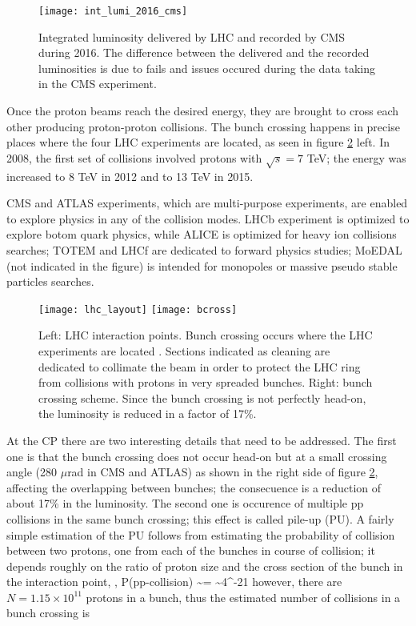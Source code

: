 \begin{figure}[!h]
\centering
\texttt{[image: int\_lumi\_2016\_cms]}
\caption [2016 CMS Integrated luminosity]{Integrated luminosity delivered by LHC and recorded by CMS during 2016. The difference between the delivered and the recorded luminosities is due to fails and issues occured during the data taking in the CMS experiment\cite{lumi}.}\label{fig:lumi}
\end{figure}

\noindent Once the proton beams reach the desired energy, they are brought to cross each other producing proton-proton collisions. The bunch crossing happens in precise places where the four LHC experiments are located, as seen in figure \ref{fig:lhc_layout} left. In 2008, the first set of collisions involved protons with $\sqrt{s}=7$ TeV; the energy was increased to 8 TeV in 2012 and to 13 TeV in 2015.

\noindent CMS and ATLAS experiments, which are multi-purpose experiments, are enabled to explore physics in any of the collision modes. LHCb experiment is optimized to explore botom quark physics, while ALICE is optimized for heavy ion collisions searches; TOTEM and LHCf are dedicated to forward physics studies; MoEDAL (not indicated in the figure) is intended for monopoles or massive pseudo stable particles searches.

\begin{figure}[!h]
\centering
\texttt{[image: lhc\_layout]}
\texttt{[image: bcross]}
\caption [LHC interaction points]{Left: LHC interaction points. Bunch crossing occurs where the LHC experiments are located \cite{lhc_layout}. Sections indicated as cleaning are dedicated to collimate the beam in order to protect the LHC ring from collisions with protons in very spreaded bunches. Right: bunch crossing scheme. Since the bunch crossing is not perfectly head-on, the luminosity is reduced in a factor of 17\%.}\label{fig:lhc_layout}
\end{figure}

\noindent At the CP there are two interesting details that need to be addressed. The first one is that the bunch crossing does not occur head-on but at a small crossing angle (280 $\mu$rad in CMS and ATLAS) as shown in the right side of figure \ref{fig:lhc_layout}, affecting the overlapping between bunches; the consecuence is a reduction of about 17\% in the luminosity. The second one is occurence of multiple pp collisions in the same bunch crossing; this effect is called pile-up (PU). A fairly simple estimation of the PU follows from estimating the probability of collision between two protons, one from each of the bunches in course of collision; it depends roughly on the ratio of proton size and the cross section of the bunch in the interaction point, \ie,
\beqn
P(pp-collision) \sim {}= \sim 4^{-21}
\eeqn
\noindent however, there are $N=1.15\times 10^{11}$ protons in a bunch, thus the estimated number of collisions in a bunch crossing is

